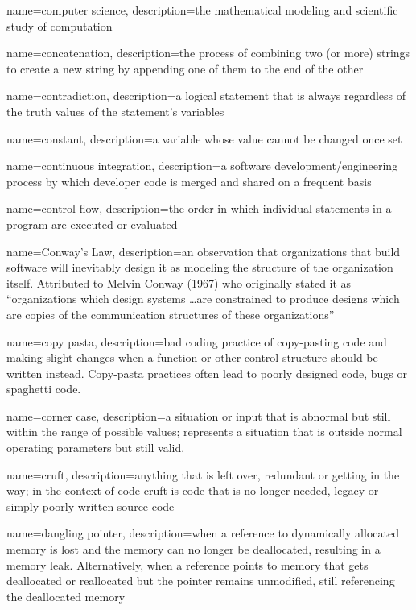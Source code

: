 {
  name=computer science,
  description={the mathematical modeling and scientific study of computation}
}

{
  name=concatenation,
  description={the process of combining two (or more) strings to create a new string by appending one of them to the end of the other}
}

{
  name=contradiction,
  description={a logical statement that is always \False regardless of the truth values of the statement's variables}
}

{
  name=constant,
  description={a variable whose value cannot be changed once set}
}

{
  name=continuous integration,
  description={a software development/engineering process by which developer code is merged and shared on a frequent basis}
}

{
  name=control flow,
  description={the order in which individual statements in a program are executed or evaluated}
}

{
  name=Conway's Law,
  description={an observation that organizations that build software will inevitably design it as modeling the structure of the organization itself.  Attributed to Melvin Conway (1967) who originally stated it as ``organizations which design systems \ldots are constrained to produce designs which are copies of the communication structures of these organizations''}
}

{
  name=copy pasta,
  description={bad coding practice of copy-pasting code and making slight changes when a function or other control structure should be written instead.  Copy-pasta practices often lead to poorly designed code, bugs or spaghetti code.}
}

{
  name=corner case,
  description={a situation or input that is abnormal but still within the range of possible values; represents a situation that is outside normal operating parameters but still valid.}
}

{
  name=cruft,
  description={anything that is left over, redundant or getting in the way; in the context of code cruft is code that is no longer needed, legacy or simply poorly written source code}
}

{
  name=dangling pointer,
  description={when a reference to dynamically allocated memory is lost and the memory can no longer be deallocated, resulting in a memory leak.  Alternatively, when a reference points to memory that gets deallocated or reallocated but the pointer remains unmodified, still referencing the deallocated memory}
}

